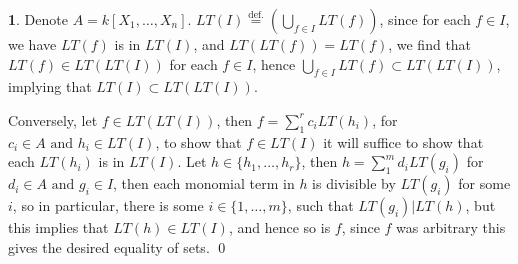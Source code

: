 \documentclass[11pt]{article}
\theoremstyle{definition}
\newtheorem{pb}{}
\newcommand{\set}[1]{\{#1\}}
\newcommand{\tand}{\text{ and }}
\begin{document}
    \newpage
    \begin{pb}
        Denote \(A = k[X_1,\hdots,X_n]\). \(LT(I) \overset{\text{def.}}{=} \left(\bigcup_{f \in I}LT(f)\right)\), since for each \(f \in I\), we have \(LT(f)\) is in \(LT(I)\), and \(LT(LT(f)) = LT(f)\), we find that \(LT(f) \in LT(LT(I))\) for each \(f \in I\), hence \(\bigcup_{f \in I}LT(f) \subset LT(LT(I))\), implying that \(LT(I) \subset LT(LT(I))\).

        Conversely, let \(f \in LT(LT(I))\), then \(f = \sum_1^r c_iLT(h_i)\), for \(c_i \in A \tand h_i \in LT(I)\), to show that \(f \in LT(I)\) it will suffice to show that each \(LT(h_i)\) is in \(LT(I)\). Let \(h \in \set{h_1,\hdots,h_r}\), then \(h = \sum_1^m d_iLT(g_i)\) for \(d_i \in A \tand g_i \in I\), then each monomial term in \(h\) is divisible by \(LT(g_i)\) for some \(i\), so in particular, there is some \(i \in \set{1,\hdots,m}\), such that \(LT(g_i) \vert LT(h)\), but this implies that \(LT(h) \in LT(I)\), and hence so is \(f\), since \(f\) was arbitrary this gives the desired equality of sets. \qed
    \end{pb}
\end{document}
